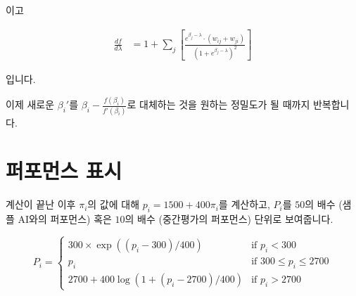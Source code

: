 \documentclass{article}
\begin{document}
이고

\begin{align*}
\frac{df}{d \lambda} & = 1 + \sum_j\left[\frac{e^{\beta_j - \lambda} \cdot (w_{ij} + w_{ji})}{(1+e^{\beta_j - \lambda})^2}\right]    
\end{align*}

입니다.

이제 새로운 $\beta_i' $를 $\beta_i - \frac{f(\beta_i)}{f'(\beta_i)}$로 대체하는 것을 원하는 정밀도가 될 때까지 반복합니다. 

\section{퍼포먼스 표시}
계산이 끝난 이후 $\pi_i$의 값에 대해 $p_i = 1500 + 400 \pi_i$를 계산하고, $P_i$를 $50$의 배수 (샘플 AI와의 퍼포먼스) 혹은 $10$의 배수 (중간평가의 퍼포먼스) 단위로 보여줍니다. 

\begin{equation*}
P_i =
\begin{cases}
300 \times \exp((p_i-300)/400) & \text{if  } p_i < 300 \\
p_i & \text{if  } 300 \le p_i \le 2700 \\
2700 + 400\log ( 1 + (p_i-2700)/400) & \text{if  } p_i > 2700 
\end{cases}
\end{equation*}

\printbibliography
\end{document}
